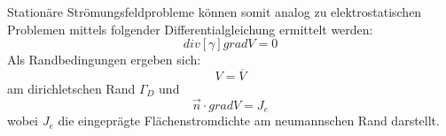  Stationäre Strömungsfeldprobleme können somit analog zu elektrostatischen Problemen mittels folgender Differentialgleichung ermittelt werden:
 \begin{equation}
\mathit{div}[\gamma]\mathit{grad}V = 0
 \end{equation}
 Als Randbedingungen ergeben sich:
 \begin{equation}
 \label{eq:current_dirichlet_condition}
 V = \overline{V}
 \end{equation}
 am dirichletschen Rand $\Gamma_D$ und 
 \begin{equation}
 \label{eq:current_neumann_condition}
 \vec{n}\cdot\mathit{grad}V = J_e
 \end{equation}
 wobei $J_e$ die eingeprägte Flächenstromdichte am neumannschen Rand darstellt.




